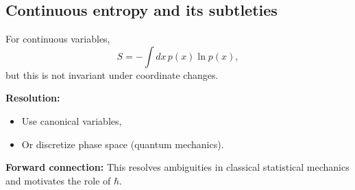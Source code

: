 \documentclass[9pt,twocoloumn]{article}
\begin{document}
\subsection*{Continuous entropy and its subtleties}
For continuous variables,
\[
S = -\int dx\, p(x)\ln p(x),
\]
but this is not invariant under coordinate changes.

\textbf{Resolution:}
\begin{itemize}
\item Use canonical variables,
\item Or discretize phase space (quantum mechanics).
\end{itemize}

\textbf{Forward connection:} This resolves ambiguities in classical statistical mechanics and motivates the role of $\hbar$.
\end{document}
